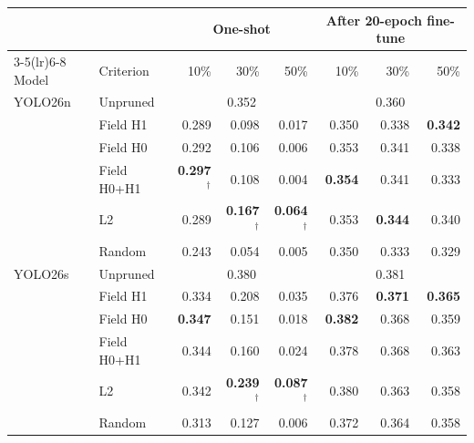 \begin{tabular}{llrrrrrr}
\toprule
 & & \multicolumn{3}{c}{One-shot} & \multicolumn{3}{c}{After 20-epoch fine-tune} \\
\cmidrule(lr){3-5}\cmidrule(lr){6-8}
Model & Criterion & 10\% & 30\% & 50\% & 10\% & 30\% & 50\% \\
\midrule
YOLO26n & Unpruned & \multicolumn{3}{c}{0.352} & \multicolumn{3}{c}{0.360} \\
 & Field H1 & 0.289 & 0.098 & 0.017 & 0.350 & 0.338 & \textbf{0.342} \\
 & Field H0 & 0.292 & 0.106 & 0.006 & 0.353 & 0.341 & 0.338 \\
 & Field H0+H1 & \textbf{0.297}$^\dagger$ & 0.108 & 0.004 & \textbf{0.354} & 0.341 & 0.333 \\
 & L2 & 0.289 & \textbf{0.167}$^\dagger$ & \textbf{0.064}$^\dagger$ & 0.353 & \textbf{0.344} & 0.340 \\
 & Random & 0.243 & 0.054 & 0.005 & 0.350 & 0.333 & 0.329 \\
\midrule
YOLO26s & Unpruned & \multicolumn{3}{c}{0.380} & \multicolumn{3}{c}{0.381} \\
 & Field H1 & 0.334 & 0.208 & 0.035 & 0.376 & \textbf{0.371} & \textbf{0.365} \\
 & Field H0 & \textbf{0.347} & 0.151 & 0.018 & \textbf{0.382} & 0.368 & 0.359 \\
 & Field H0+H1 & 0.344 & 0.160 & 0.024 & 0.378 & 0.368 & 0.363 \\
 & L2 & 0.342 & \textbf{0.239}$^\dagger$ & \textbf{0.087}$^\dagger$ & 0.380 & 0.363 & 0.358 \\
 & Random & 0.313 & 0.127 & 0.006 & 0.372 & 0.364 & 0.358 \\
\bottomrule
\end{tabular}
